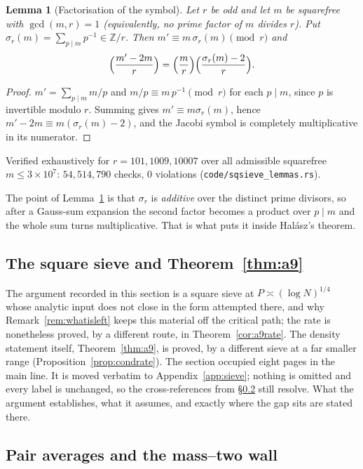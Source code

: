 \documentclass[11pt]{article}
\newtheorem{lemma}[theorem]{Lemma}
\theoremstyle{definition}
\begin{document}
\begin{lemma}[Factorisation of the symbol]\label{lem:symbolfact}
Let $r$ be odd and let $m$ be squarefree with $\gcd(m,r)=1$ \textup{(}equivalently, no prime factor
of $m$ divides $r$\textup{)}.
Put $\sigma_r(m)=\sum_{p\mid m}p^{-1}\in\mathbb{Z}/r$. Then $m'\equiv m\,\sigma_r(m)\pmod r$ and
\[ \Bigl(\frac{m'-2m}{r}\Bigr)=\Bigl(\frac{m}{r}\Bigr)\Bigl(\frac{\sigma_r(m)-2}{r}\Bigr). \]
\end{lemma}
\begin{proof}
$m'=\sum_{p\mid m}m/p$ and $m/p\equiv m\,p^{-1}\pmod r$ for each $p\mid m$, since $p$ is invertible
modulo $r$. Summing gives $m'\equiv m\sigma_r(m)$, hence $m'-2m\equiv m(\sigma_r(m)-2)$, and the
Jacobi symbol is completely multiplicative in its numerator.
\end{proof}
Verified exhaustively for $r=101,1009,10007$ over all admissible squarefree $m\le3\times10^7$:
$54{,}514{,}790$ checks, $0$ violations \textup{(\texttt{code/sqsieve\_lemmas.rs})}.

The point of Lemma~\ref{lem:symbolfact} is that $\sigma_r$ is \emph{additive} over the distinct
prime divisors, so after a Gauss-sum expansion the second factor becomes a product over $p\mid m$
and the whole sum turns multiplicative. That is what puts it inside Hal\'asz's theorem.

\subsection{The square sieve and Theorem~\ref{thm:a9}}\label{ssec:sieve}

The argument recorded in this section is a square sieve at $P\asymp(\log N)^{1/4}$ whose analytic
input does not close in the form attempted there, and why Remark~\ref{rem:whatisleft} keeps this
material off the critical path; the rate is nonetheless proved, by a different route, in
Theorem~\ref{cor:a9rate}.
The density statement itself, Theorem~\ref{thm:a9}, is proved, by a different sieve at a far smaller
range (Proposition~\ref{prop:condrate}). The section occupied eight pages in the main line. It is
moved verbatim to Appendix~\ref{app:sieve}; nothing is omitted and every label is unchanged, so the
cross-references from \S\ref{ssec:pairavg} still resolve. What the argument establishes, what it
assumes, and exactly where the gap sits are stated there.

\subsection{Pair averages and the mass--two wall}\label{ssec:pairavg}
\end{document}
